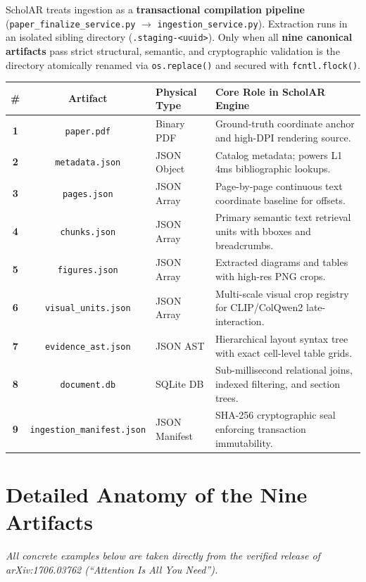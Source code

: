 \documentclass[11pt,a4paper]{article}
\begin{document}
ScholAR treats ingestion as a \textbf{transactional compilation pipeline} (\texttt{paper\_finalize\_service.py} $\to$ \texttt{ingestion\_service.py}). Extraction runs in an isolated sibling directory (\texttt{.staging-<uuid>}). Only when all \textbf{nine canonical artifacts} pass strict structural, semantic, and cryptographic validation is the directory atomically renamed via \texttt{os.replace()} and secured with \texttt{fcntl.flock()}.

\vspace{0.4em}
\begin{center}
\small
\begin{tabular}{@{}cclp{7.2cm}@{}}
\toprule
\textbf{\#} & \textbf{Artifact} & \textbf{Physical Type} & \textbf{Core Role in ScholAR Engine} \\
\midrule
\textbf{1} & \texttt{paper.pdf} & Binary PDF & Ground-truth coordinate anchor and high-DPI rendering source. \\
\textbf{2} & \texttt{metadata.json} & JSON Object & Catalog metadata; powers L1 4ms bibliographic lookups. \\
\textbf{3} & \texttt{pages.json} & JSON Array & Page-by-page continuous text coordinate baseline for offsets. \\
\textbf{4} & \texttt{chunks.json} & JSON Array & Primary semantic text retrieval units with bboxes and breadcrumbs. \\
\textbf{5} & \texttt{figures.json} & JSON Array & Extracted diagrams and tables with high-res PNG crops. \\
\textbf{6} & \texttt{visual\_units.json} & JSON Array & Multi-scale visual crop registry for CLIP/ColQwen2 late-interaction. \\
\textbf{7} & \texttt{evidence\_ast.json} & JSON AST & Hierarchical layout syntax tree with exact cell-level table grids. \\
\textbf{8} & \texttt{document.db} & SQLite DB & Sub-millisecond relational joins, indexed filtering, and section trees. \\
\textbf{9} & \texttt{ingestion\_manifest.json} & JSON Manifest & SHA-256 cryptographic seal enforcing transaction immutability. \\
\bottomrule
\end{tabular}
\end{center}

\newpage

\section{Detailed Anatomy of the Nine Artifacts}
\textit{All concrete examples below are taken directly from the verified release of arXiv:1706.03762 (``Attention Is All You Need'').}
\end{document}
